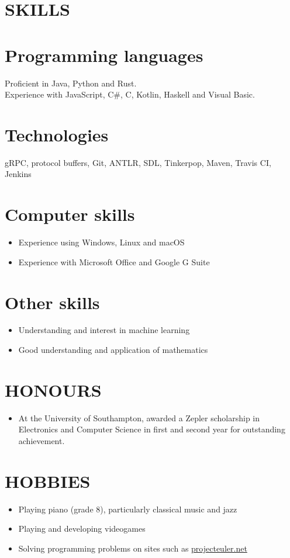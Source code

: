 \documentclass[margin]{res}
\begin{document}
\begin{resume}
\section{SKILLS}

\normalsize{\section{Programming languages}}
Proficient in Java, Python and Rust. \\
Experience with JavaScript, C\#, C, Kotlin, Haskell and Visual Basic.

\normalsize{\section{Technologies}}
gRPC, protocol buffers, Git, ANTLR, SDL, Tinkerpop, Maven, Travis CI, Jenkins

\normalsize{\section{Computer skills}}
\begin{itemize}
\item Experience using Windows, Linux and macOS
\item Experience with Microsoft Office and Google G Suite
\end{itemize}

\normalsize{\section{Other skills}}
\begin{itemize}
\item Understanding and interest in machine learning
\item Good understanding and application of mathematics
\end{itemize}

\section{HONOURS}
\begin{itemize}
\item At the University of Southampton, awarded a Zepler scholarship in
Electronics and Computer Science in first and second year for outstanding
achievement.
\end{itemize}

\section{HOBBIES}
\begin{itemize}
\item Playing piano (grade 8), particularly classical music and jazz
\item Playing and developing videogames
\item Solving programming problems on sites such as
\href{https://projecteuler.net/}{projecteuler.net}
\end{itemize}

\end{resume}
\end{document}
